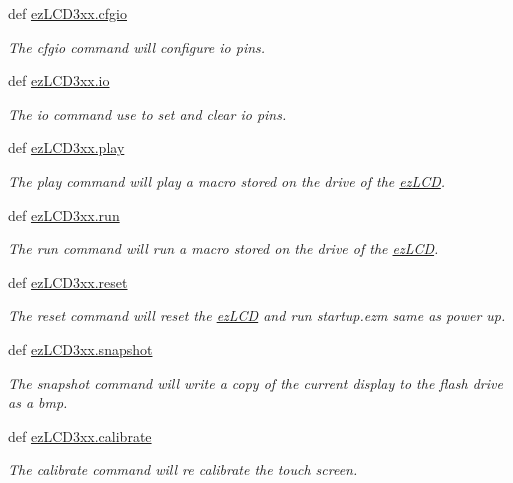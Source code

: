 \begin{DoxyCompactItemize}
def \hyperlink{group___general_ga38687b7d07bf93afe6891d3dca6205f4}{ez\-L\-C\-D3xx.\-cfgio}
\begin{DoxyCompactList}\small\item\em The cfgio command will configure io pins. \end{DoxyCompactList}\item 
def \hyperlink{group___general_gaf87ad0b88f8a279c20666363bc7460b6}{ez\-L\-C\-D3xx.\-io}
\begin{DoxyCompactList}\small\item\em The io command use to set and clear io pins. \end{DoxyCompactList}\item 
def \hyperlink{group___general_ga15f87f284189816d98ab5bf0b5a94a99}{ez\-L\-C\-D3xx.\-play}
\begin{DoxyCompactList}\small\item\em The play command will play a macro stored on the drive of the \hyperlink{classez_l_c_d3xx_1_1ez_l_c_d}{ez\-L\-C\-D}. \end{DoxyCompactList}\item 
def \hyperlink{group___general_ga7faa11f7fbe4da6ba981a5b8c4cb37aa}{ez\-L\-C\-D3xx.\-run}
\begin{DoxyCompactList}\small\item\em The run command will run a macro stored on the drive of the \hyperlink{classez_l_c_d3xx_1_1ez_l_c_d}{ez\-L\-C\-D}. \end{DoxyCompactList}\item 
def \hyperlink{group___general_gabc1cd3bb62dfa8a8f37f5da5cbb3e85c}{ez\-L\-C\-D3xx.\-reset}
\begin{DoxyCompactList}\small\item\em The reset command will reset the \hyperlink{classez_l_c_d3xx_1_1ez_l_c_d}{ez\-L\-C\-D} and run startup.\-ezm same as power up. \end{DoxyCompactList}\item 
def \hyperlink{group___general_ga8a1ef000b3c71704260c9e5f949e80de}{ez\-L\-C\-D3xx.\-snapshot}
\begin{DoxyCompactList}\small\item\em The snapshot command will write a copy of the current display to the flash drive as a bmp. \end{DoxyCompactList}\item 
\hypertarget{group___general_gae53650dc26de7b1316c9241eec0751bb}{def \hyperlink{group___general_gae53650dc26de7b1316c9241eec0751bb}{ez\-L\-C\-D3xx.\-calibrate}}\label{group___general_gae53650dc26de7b1316c9241eec0751bb}

\begin{DoxyCompactList}\small\item\em The calibrate command will re calibrate the touch screen. \end{DoxyCompactList}\end{DoxyCompactItemize}


